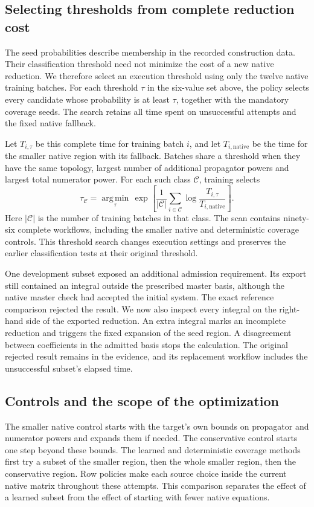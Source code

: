 \subsection{Selecting thresholds from complete reduction cost}
The seed probabilities describe membership in the recorded construction data.
Their classification threshold need not minimize the cost of a new native
reduction. We therefore select an execution threshold using only the twelve
native training batches. For each threshold $\tau$ in the six-value set above,
the policy selects every candidate whose probability is at least $\tau$,
together with the mandatory coverage seeds. The search retains all time spent
on unsuccessful attempts and the fixed native fallback.

Let $T_{i,\tau}$ be this complete time for training batch $i$, and let
$T_{i,\mathrm{native}}$ be the time for the smaller native region with its
fallback. Batches share a threshold when they have the same topology, largest
number of additional propagator powers and largest total numerator power.
For each such class $\mathcal C$, training selects
\[
 \tau_{\mathcal C}=
 \underset{\tau}{\operatorname{arg\,min}}\,
 \exp\left[
  \frac{1}{|\mathcal C|}
  \sum_{i\in\mathcal C}
  \log\frac{T_{i,\tau}}{T_{i,\mathrm{native}}}
 \right].
\]
Here $|\mathcal C|$ is the number of training batches in that class.
The scan contains ninety-six complete workflows, including the smaller
native and deterministic coverage controls. This threshold search changes
execution settings and preserves the earlier classification tests at their
original threshold.

One development subset exposed an additional admission requirement. Its
export still contained an integral outside the prescribed master basis,
although the native master check had accepted the initial system. The exact
reference comparison rejected the result. We now also inspect every
integral on the right-hand side of the exported reduction. An extra integral
marks an incomplete reduction and triggers the fixed expansion of the seed
region. A disagreement between coefficients in the admitted basis stops the
calculation. The original rejected result remains in the evidence, and its
replacement workflow includes the unsuccessful subset's elapsed time.

\subsection{Controls and the scope of the optimization}
The smaller native control starts with the target's own bounds on propagator
and numerator powers and expands them if needed. The conservative control
starts one step beyond these bounds. The learned and deterministic coverage
methods first try a subset of the smaller region, then the whole smaller
region, then the conservative region. Row policies make each source choice
inside the current native matrix throughout these attempts. This comparison
separates the effect of a learned subset from the effect of starting with
fewer native equations.

